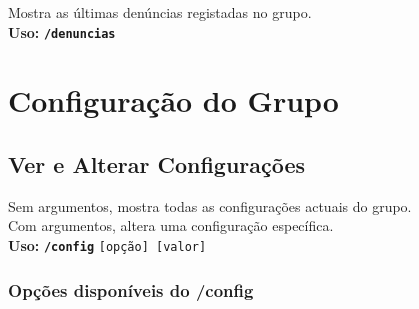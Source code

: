 \documentclass[12pt,a4paper]{article}
\newcommand{\cmd}[1]{\texttt{\textcolor{orbisblue}{\textbf{#1}}}}
\newcommand{\param}[1]{\texttt{\textcolor{orbisMid}{#1}}}
\begin{document}
\begin{tcolorbox}[cmdbox, title={\faExclamationCircle\ /denuncias}]
Mostra as últimas denúncias registadas no grupo.\\
\textbf{Uso:} \cmd{/denuncias}
\end{tcolorbox}


\section{Configuração do Grupo}
\label{sec:config}

\subsection{Ver e Alterar Configurações}

\begin{tcolorbox}[cmdbox, title={\faCog\ /config}]
Sem argumentos, mostra todas as configurações actuais do grupo.\\
Com argumentos, altera uma configuração específica.\\
\textbf{Uso:} \cmd{/config} \param{[opção] [valor]}
\end{tcolorbox}

\subsubsection{Opções disponíveis do /config}
\end{document}
